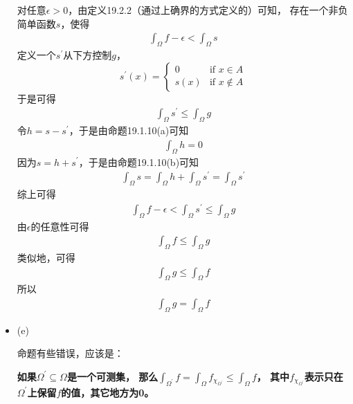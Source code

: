 \documentclass{article}
\begin{document}
\begin{itemize}
        对任意$\epsilon > 0$，由定义19.2.2（通过上确界的方式定义的）可知，
        存在一个非负简单函数$s$，使得
        \begin{align*}
          \int_{\Omega} f - \epsilon < \int_{\Omega} s
        \end{align*}
        定义一个$s^\prime$从下方控制$g$，
        \begin{equation*}
          s^\prime(x) = \begin{cases}
            0    & \text{if } x \in A    \\
            s(x) & \text{if } x \notin A
          \end{cases}
        \end{equation*}
        于是可得
        \begin{align*}
          \int_{\Omega} s^\prime \leq \int_{\Omega} g
        \end{align*}
        令$h = s - s^\prime$，于是由命题19.1.10(a)可知
        \begin{align*}
          \int_{\Omega} h = 0
        \end{align*}
        因为$s = h + s^\prime$，于是由命题19.1.10(b)可知
        \begin{align*}
          \int_{\Omega} s = \int_{\Omega} h + \int_{\Omega} s^\prime = \int_{\Omega} s^\prime
        \end{align*}
        综上可得
        \begin{align*}
          \int_{\Omega} f - \epsilon < \int_{\Omega} s^\prime \leq \int_{\Omega} g
        \end{align*}
        由$\epsilon$的任意性可得
        \begin{align*}
          \int_{\Omega} f \leq \int_{\Omega} g
        \end{align*}
        类似地，可得
        \begin{align*}
          \int_{\Omega} g \leq \int_{\Omega} f
        \end{align*}
        所以
        \begin{align*}
          \int_{\Omega} g  = \int_{\Omega} f
        \end{align*}

  \item (e)

        命题有些错误，应该是：

        \textbf{如果$\Omega^\prime \subseteq \Omega$是一个可测集，
          那么$\int_{\Omega^\prime} f = \int_{\Omega} f_{\chi_{\Omega^\prime}} \leq \int_{\Omega} f$，
          其中$f_{\chi_{\Omega^\prime}}$表示只在$\Omega^\prime$上保留$f$的值，其它地方为0。
        }


\end{itemize}
\end{document}
